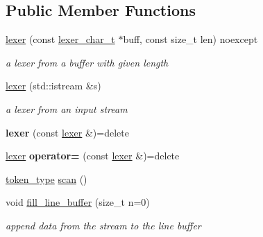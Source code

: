 \subsection*{Public Member Functions}
\begin{DoxyCompactItemize}
\item 
\hypertarget{classnlohmann_1_1basic__json_1_1lexer_a944d97e5ede28ce67b08133059285d4e}{}\label{classnlohmann_1_1basic__json_1_1lexer_a944d97e5ede28ce67b08133059285d4e} 
\hyperlink{classnlohmann_1_1basic__json_1_1lexer_a944d97e5ede28ce67b08133059285d4e}{lexer} (const \hyperlink{classnlohmann_1_1basic__json_1_1lexer_a7858ae971d07f21ad47fa8a0421001db}{lexer\+\_\+char\+\_\+t} $\ast$buff, const size\+\_\+t len) noexcept
\begin{DoxyCompactList}\small\item\em a lexer from a buffer with given length \end{DoxyCompactList}\item 
\hypertarget{classnlohmann_1_1basic__json_1_1lexer_ad79f99ca1c4734a7103bc1d91162b4f3}{}\label{classnlohmann_1_1basic__json_1_1lexer_ad79f99ca1c4734a7103bc1d91162b4f3} 
\hyperlink{classnlohmann_1_1basic__json_1_1lexer_ad79f99ca1c4734a7103bc1d91162b4f3}{lexer} (std\+::istream \&s)
\begin{DoxyCompactList}\small\item\em a lexer from an input stream \end{DoxyCompactList}\item 
\hypertarget{classnlohmann_1_1basic__json_1_1lexer_a18cd0b0203240c650de724eaa372fe20}{}\label{classnlohmann_1_1basic__json_1_1lexer_a18cd0b0203240c650de724eaa372fe20} 
{\bfseries lexer} (const \hyperlink{classnlohmann_1_1basic__json_1_1lexer}{lexer} \&)=delete
\item 
\hypertarget{classnlohmann_1_1basic__json_1_1lexer_a862a22693d9fadbf4a5f00207da1dd00}{}\label{classnlohmann_1_1basic__json_1_1lexer_a862a22693d9fadbf4a5f00207da1dd00} 
\hyperlink{classnlohmann_1_1basic__json_1_1lexer}{lexer} {\bfseries operator=} (const \hyperlink{classnlohmann_1_1basic__json_1_1lexer}{lexer} \&)=delete
\item 
\hyperlink{classnlohmann_1_1basic__json_1_1lexer_a96887d6cd131e3d3a85a9d71fbdbcdf7}{token\+\_\+type} \hyperlink{classnlohmann_1_1basic__json_1_1lexer_a94193a4904687939efe186d2ae4397a1}{scan} ()
\item 
void \hyperlink{classnlohmann_1_1basic__json_1_1lexer_adbaca1041a152dc647ff22abc691889f}{fill\+\_\+line\+\_\+buffer} (size\+\_\+t n=0)
\begin{DoxyCompactList}\small\item\em append data from the stream to the line buffer \end{DoxyCompactList}\item 

\end{DoxyCompactItemize}
